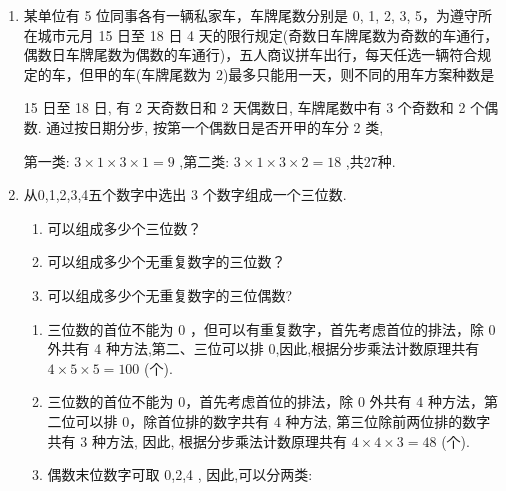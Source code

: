 \begin{enumerate}
\begin{enumerate}
\begin{jieda}
            第一类在 1 和 2 上种植小麦, “ 1 ”有 7 种选择, “ 2 ”有 6 种选择, 剩下 3 块实验田种植水稻,
            
            分别有 10,9,8 种选择,所以共计 $7 \times  6 \times  {10} \times  9 \times  8 = {30240}$ 种;
            
            第二、三、四类和第一类种数相同. 综上总计有 ${30240} \times  4 = {120960}$ 种方法.
        \end{jieda}
        
        \item 某单位有 5 位同事各有一辆私家车，车牌尾数分别是 0, 1, 2, 3, 5，为遵守所在城市元月 15 日至 18 日 4 天的限行规定(奇数日车牌尾数为奇数的车通行，偶数日车牌尾数为偶数的车通行)，五人商议拼车出行，每天任选一辆符合规定的车，但甲的车(车牌尾数为 2)最多只能用一天，则不同的用车方案种数是 
        \begin{jieda}
            15 日至 18 日, 有 2 天奇数日和 2 天偶数日, 车牌尾数中有 3 个奇数和 2 个偶数. 通过按日期分步, 按第一个偶数日是否开甲的车分 2 类,
            
            第一类: $3 \times  1 \times  3 \times  1 = 9$ ,第二类: $3 \times  1 \times  3 \times  2 = {18}$ ,共27种.
        \end{jieda}
        \item 从0,1,2,3,4五个数字中选出 3 个数字组成一个三位数.
        \begin{enumerate}
            \item 可以组成多少个三位数？
            \item 可以组成多少个无重复数字的三位数？
            \item 可以组成多少个无重复数字的三位偶数?
        \end{enumerate}
        \begin{jieda}
            \begin{enumerate}
                \item 三位数的首位不能为 0 ，但可以有重复数字，首先考虑首位的排法，除 0 外共有 4 种方法,第二、三位可以排 0,因此,根据分步乘法计数原理共有 $4 \times  5 \times  5 = {100}$ (个).
                
                \item 三位数的首位不能为 0，首先考虑首位的排法，除 0 外共有 4 种方法，第二位可以排 0，除首位排的数字共有 4 种方法, 第三位除前两位排的数字共有 3 种方法, 因此, 根据分步乘法计数原理共有 $4 \times  4 \times  3 = {48}$ (个).
                \item 偶数末位数字可取 0,2,4 , 因此,可以分两类:
                

\end{enumerate}
\end{jieda}
\end{enumerate}
\end{enumerate}
